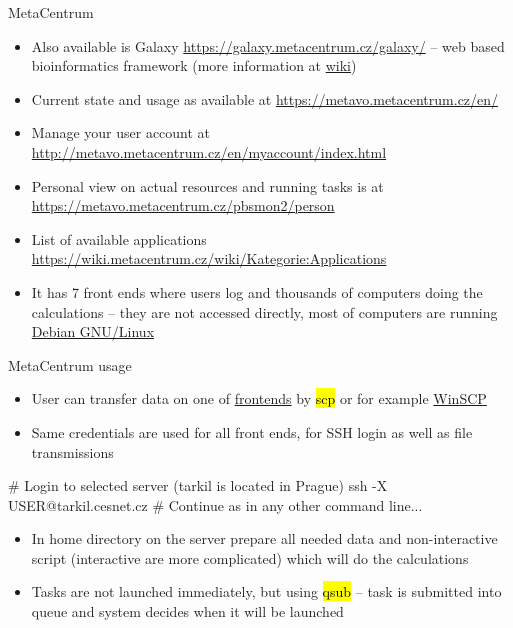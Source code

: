 \documentclass[compress, ucs, xelatex, 11pt, xcolor=svgnames,
  hyperref={
    bookmarks=true,
    unicode=true,
    colorlinks=true,
    pdftitle={Linux, command line and MetaCentrum},
    plainpages=false,
    pdfauthor={Vojtech Zeisek},
    pdfsubject={Course about use of Linux command line, writing shell scripts and using MetaCentrum of CESNET},
    pdfcreator={XeLaTeX},
    pdfkeywords={Linux, GNU, BASH, shell, command line, MetaCentrum},
    linkcolor=Red,
    anchorcolor=Blue,
    citecolor=Purple,
    filecolor=DodgerBlue,
    menucolor=DarkOrchid,
    urlcolor=DeepSkyBlue,
    pdftex},
  url={hyphens, lowtilde} %
  ]{beamer}
\renewcommand{\texttt}[1]{\hl{\ttfamily #1}}
\begin{document}
\begin{frame}{MetaCentrum}
\begin{itemize}
  \item Also available is Galaxy \url{https://galaxy.metacentrum.cz/galaxy/} -- web based bioinformatics framework (more information at \href{https://wiki.metacentrum.cz/wiki/Galaxy_application}{wiki})
  \item Current state and usage as available at \url{https://metavo.metacentrum.cz/en/}
  \item Manage your user account at \url{http://metavo.metacentrum.cz/en/myaccount/index.html}
  \item Personal view on actual resources and running tasks is at \url{https://metavo.metacentrum.cz/pbsmon2/person}
  \item List of available applications \url{https://wiki.metacentrum.cz/wiki/Kategorie:Applications}
  \item It has 7 front ends where users log and thousands of computers doing the calculations -- they are not accessed directly, most of computers are running \href{https://www.debian.org/}{Debian GNU/Linux}
\end{itemize}
\end{frame}

\begin{frame}[fragile]{MetaCentrum usage}
\begin{itemize}
  \item User can transfer data on one of \href{https://wiki.metacentrum.cz/wiki/Frontend}{frontends} by \texttt{scp} or for example \href{http://winscp.net/eng/index.php}{WinSCP}
  \item Same credentials are used for all front ends, for SSH login as well as file transmissions
\end{itemize}
  \begin{bashcode}
    # Login to selected server (tarkil is located in Prague)
    ssh -X USER@tarkil.cesnet.cz
    # Continue as in any other command line...
  \end{bashcode}
\begin{itemize}
  \item In home directory on the server prepare all needed data and non-interactive script (interactive are more complicated) which will do the calculations
  \item Tasks are not launched immediately, but using \texttt{qsub} -- task is submitted into queue and system decides when it will be launched
\end{itemize}
\end{frame}
\end{document}
